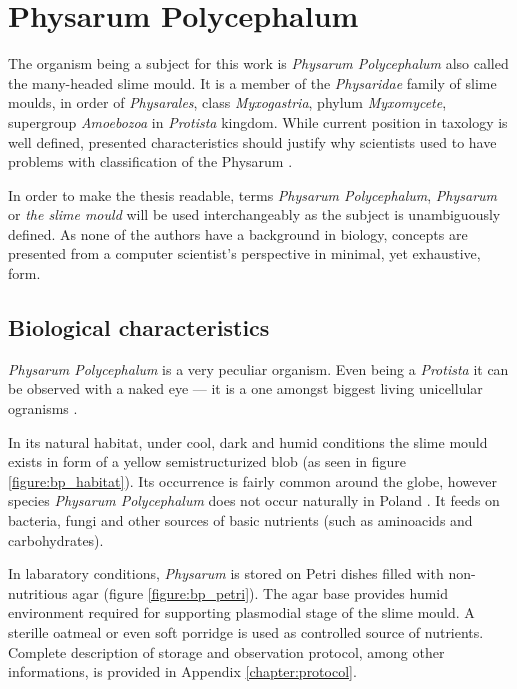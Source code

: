 \section{Physarum Polycephalum}
\label{section:background_physarum}

The organism being a subject for this work is \textit{Physarum Polycephalum} also called the many-headed slime mould. It is a member of the \textit{Physaridae} family of slime moulds, in order of \textit{Physarales}, class \textit{Myxogastria}, phylum \textit{Myxomycete}, supergroup \textit{Amoebozoa} in \textit{Protista} kingdom. While current position in taxology is well defined, presented characteristics should justify why scientists used to have problems with classification of the Physarum \cite{stephenson1994myxomycetes}.

In order to make the thesis readable, terms \textit{Physarum Polycephalum}, \textit{Physarum} or \textit{the slime mould} will be used interchangeably as the subject is unambiguously defined. As none of the authors have a background in biology, concepts are presented from a computer scientist's perspective in minimal, yet exhaustive, form.


\subsection{Biological characteristics}

\textit{Physarum Polycephalum} is a very peculiar organism. Even being a \textit{Protista} it can be observed with a naked eye --- it is a one amongst biggest living unicellular ogranisms \cite{stephenson1994myxomycetes}. 

In its natural habitat, under cool, dark and humid conditions the slime mould exists in form of a yellow semistructurized blob (as seen in figure \ref{figure:bp_habitat}). Its occurrence is fairly common around the globe, however species \textit{Physarum Polycephalum} does not occur naturally in Poland \cite{narkiewicz2013grzyby}. It feeds on bacteria, fungi and other sources of basic nutrients (such as aminoacids and carbohydrates).

In labaratory conditions, \textit{Physarum} is stored on Petri dishes filled with non-nutritious agar (figure \ref{figure:bp_petri}). The agar base provides humid environment required for supporting plasmodial stage of the slime mould. A sterille oatmeal or even soft porridge is used as controlled source of nutrients. Complete description of storage and observation protocol, among other informations, is provided in Appendix \ref{chapter:protocol}.

